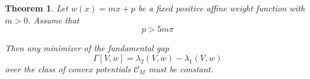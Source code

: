 \documentclass[12pt,a4paper]{amsart}
\newtheorem{thm}{Theorem}[section]
\begin{document}
\begin{thm}\label{step2}
Let $w(x)=mx+p$ be a fixed positive affine weight function with $m>0$. Assume that
\[
p>5m\pi
\]

\noindent Then any minimizer of the fundamental gap
\[
\Gamma[V,w] = \lambda_2(V,w) - \lambda_1(V,w)
\]
over the class of convex potentials $ \mathcal{C}_M$ must be constant.


    
\end{thm}
\end{document}
